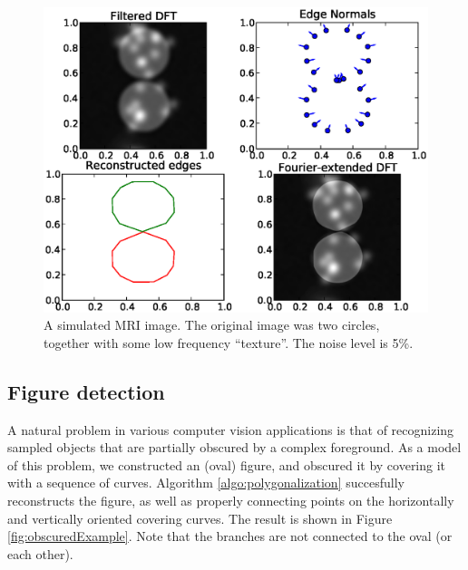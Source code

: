 \documentclass{article}
\numberwithin{cntr}{section}
\numberwithin{equation}{section}
\begin{document}
\begin{figure}
\setlength{\unitlength}{0.240900pt}
\ifx\plotpoint\undefined\newsavebox{\plotpoint}\fi
\sbox{\plotpoint}{\rule[-0.200pt]{0.400pt}{0.400pt}}%
\includegraphics[scale=0.5]{mri_edges.eps}
\caption{A simulated MRI image. The original image was two circles, together with some low frequency ``texture''. The noise level is 5\%.}
\label{fig:mriExample}
\end{figure}

\subsection{Figure detection}

A natural problem in various computer vision applications is that of
recognizing sampled objects that are partially obscured by a
complex foreground.
As a model of this problem, we constructed an (oval)
figure, and obscured it by covering it with a sequence of curves.
Algorithm \ref{algo:polygonalization} succesfully reconstructs the
figure, as well as properly connecting points on the
horizontally and vertically oriented covering curves.
The result is shown in
Figure \ref{fig:obscuredExample}. Note that the branches are not
connected to the oval (or each other).
\end{document}
